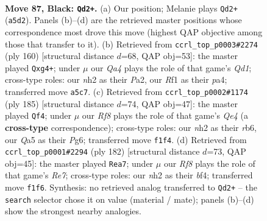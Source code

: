 \documentclass[11pt]{article}
\begin{document}
\clearpage

\begin{figure}[p]\centering
\begin{subfigure}{0.46\textwidth}\centering
\resizebox{\linewidth}{!}{%
\newchessgame
\chessboard[
  setfen={4k3/p5Q1/7r/q6P/3P4/4P3/6KN/4br2 b - - 2 87},
  showmover=false,
  pgfstyle=straightmove, color=movearrow, markmove={a5-d2}
]}
\caption{}
\end{subfigure}\hfill
\begin{subfigure}{0.46\textwidth}\centering
\resizebox{\linewidth}{!}{%
\newchessgame
\chessboard[
  setfen={2q5/3R1pk1/8/4p3/p5p1/8/P6p/K2Q4 w - - 0 81},
  showmover=false,
  pgfstyle=straightmove, color=movearrow, markmove={d1-g4}
]}
\caption{}
\end{subfigure}
\\[4pt]
\begin{subfigure}{0.46\textwidth}\centering
\resizebox{\linewidth}{!}{%
\newchessgame
\chessboard[
  setfen={1rQ5/1P6/1RK3pk/4qp2/3P4/8/8/8 b - - 0 93},
  showmover=false,
  pgfstyle=straightmove, color=movearrow, markmove={e5-f4}
]}
\caption{}
\end{subfigure}\hfill
\begin{subfigure}{0.46\textwidth}\centering
\resizebox{\linewidth}{!}{%
\newchessgame
\chessboard[
  setfen={8/4R3/1q3k2/R5p1/5b2/8/1PB5/1K6 w - - 24 92},
  showmover=false,
  pgfstyle=straightmove, color=movearrow, markmove={e7-a7}
]}
\caption{}
\end{subfigure}
\caption{\textbf{Move 87, Black: \texttt{Qd2+}.} (a) Our position; Melanie plays \texttt{Qd2+} (\texttt{a5d2}). Panels (b)--(d) are the retrieved master positions whose correspondence most drove this move (highest QAP objective among those that transfer to it). (b) Retrieved from \texttt{ccrl\_top\_p0003\#2274} (ply 160) [structural distance $d$=68, QAP obj=53]: the master played \texttt{Qxg4+}; under $\mu$ our \emph{Qa4} plays the role of that game's \emph{Qd1}; cross-type roles: our \emph{n}h2 as their \emph{P}a2, our \emph{R}f1 as their \emph{p}a4; transferred move \texttt{a5c7}. (c) Retrieved from \texttt{ccrl\_top\_p0002\#1174} (ply 185) [structural distance $d$=74, QAP obj=47]: the master played \texttt{Qf4}; under $\mu$ our \emph{Rf8} plays the role of that game's \emph{Qe4} (a \textbf{cross-type} correspondence); cross-type roles: our \emph{n}h2 as their \emph{r}b6, our \emph{Q}a5 as their \emph{P}g6; transferred move \texttt{f1f4}. (d) Retrieved from \texttt{ccrl\_top\_p0001\#2294} (ply 182) [structural distance $d$=73, QAP obj=45]: the master played \texttt{Rea7}; under $\mu$ our \emph{Rf8} plays the role of that game's \emph{Re7}; cross-type roles: our \emph{n}h2 as their \emph{b}f4; transferred move \texttt{f1f6}. Synthesis: no retrieved analog transferred to \texttt{Qd2+} -- the \texttt{search} selector chose it on value (material / mate); panels (b)--(d) show the strongest nearby analogies.}
\label{fig:thought-m173}
\end{figure}
\end{document}
